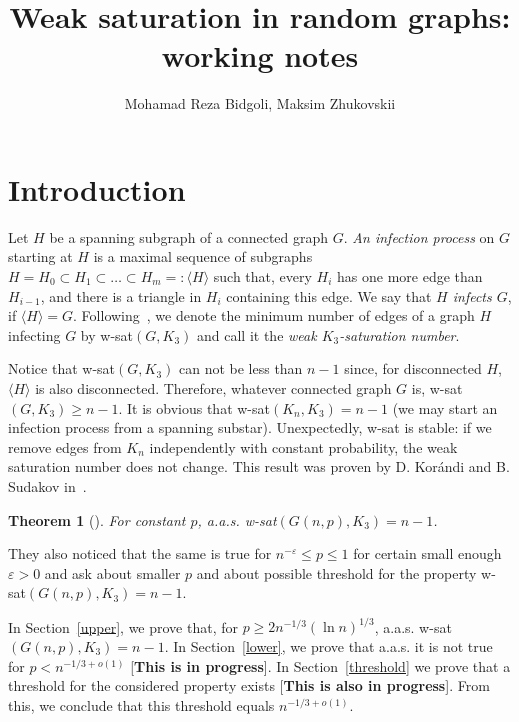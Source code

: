 \documentclass[]{article}
\title{Weak saturation in random graphs: working notes}
\author{Mohamad Reza Bidgoli, Maksim Zhukovskii}
\newtheorem{theorem}{Theorem}%
\begin{document}
\maketitle


\section{Introduction}
Let $H$ be a spanning subgraph of a connected graph $G$. {\it An infection process} on $G$ starting at $H$ is a maximal sequence of subgraphs $H = H_0 \subset H_1 \subset \ldots \subset H_m =: \langle H \rangle$ such that, every
$H_i$ has one more edge than $H_{i-1}$, and there is a triangle in $H_i$ containing this edge. We say that {\it $H$ infects $G$}, if $\langle H \rangle =G$. Following~\cite{Sudakov}, we denote the minimum number of edges of a graph $H$ infecting $G$ by w-sat$(G,K_3)$ and call it the {\it weak $K_3$-saturation number}. 

Notice that w-sat$(G,K_3)$ can not be less than $n-1$ since, for disconnected $H$, $\langle H\rangle$ is also disconnected. Therefore, whatever connected graph $G$ is, w-sat$(G,K_3)\geq n-1$. It is obvious that w-sat$(K_n,K_3)=n-1$ (we may start an infection process from a spanning substar). Unexpectedly, w-sat is stable: if we remove edges from $K_n$ independently with constant probability, the weak saturation number does not change. This result was proven by D. Kor\'{a}ndi and B. Sudakov in~\cite{Sudakov}.

\begin{theorem}[\cite{Sudakov}]
For constant $p$, a.a.s. w-sat$(G(n,p),K_3)=n-1$.
\end{theorem}

They also noticed that the same is true for $n^{-\varepsilon}\leq p\leq 1$ for certain small enough $\varepsilon>0$ and ask about smaller $p$ and about possible threshold for the property w-sat$(G(n,p),K_3)=n-1$.

In Section~\ref{upper}, we prove that, for $p \geq 2n^{-1/3} (\ln n)^{1/3}$, a.a.s. w-sat$(G(n,p),K_3)=n-1$. In Section~\ref{lower}, we prove that a.a.s. it is not true for $p<n^{-1/3+o(1)}$ [{\bf This is in progress}]. In Section~\ref{threshold} we prove that a threshold for the considered property exists [{\bf This is also in progress}]. From this, we conclude that this threshold equals $n^{-1/3+o(1)}$.
\end{document}
